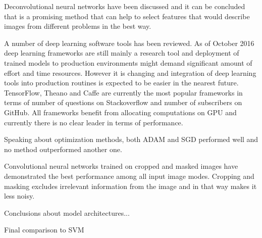 \documentclass[a4paper, 11pt, table]{article}
\begin{document}
\medskip
Deconvolutional neural networks have been discussed and it can be concluded that is a promising method that can help to select features that would describe images from different problems in the best way.  

\medskip
A number of deep learning software tools has been reviewed. As of October 2016 deep learning frameworks are still mainly a research tool and deployment of trained models to production environments might demand significant amount of effort and time resources. However it is changing and integration of deep learning tools into production routines is expected to be easier in the nearest future. TensorFlow, Theano and Caffe are currently the most popular frameworks in terms of number of questions on Stackoverflow and number of subscribers on GitHub. All frameworks benefit from allocating computations on GPU and currently there is no clear leader in terms of performance. 

\medskip
Speaking about optimization methods, both ADAM and SGD performed well and no method outperformed another one.

\medskip
Convolutional neural networks trained on cropped and masked images have demonstrated the best performance among all input image modes. Cropping and masking excludes irrelevant information from the image and in that way makes it less noisy. 

\medskip 
Conclusions about model architectures...

\medskip
Final comparison to SVM

\newpage
\printbibliography
\end{document}
